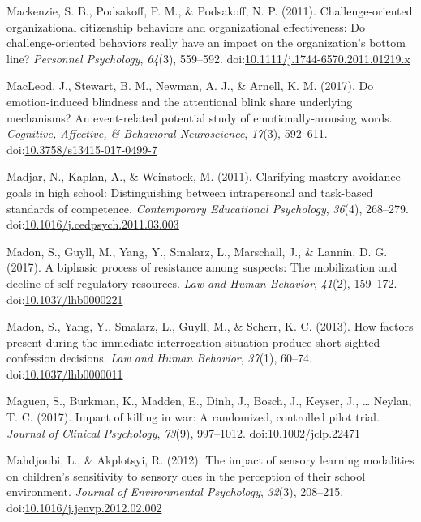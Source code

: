 \documentclass[english,man]{apa6}
\theoremstyle{definition}
\theoremstyle{definition}
\theoremstyle{definition}
\theoremstyle{remark}
\begin{document}
\hypertarget{ref-Mackenzie2011}{}
Mackenzie, S. B., Podsakoff, P. M., \& Podsakoff, N. P. (2011).
Challenge-oriented organizational citizenship behaviors and
organizational effectiveness: Do challenge-oriented behaviors really
have an impact on the organization's bottom line? \emph{Personnel
Psychology}, \emph{64}(3), 559--592.
doi:\href{https://doi.org/10.1111/j.1744-6570.2011.01219.x}{10.1111/j.1744-6570.2011.01219.x}

\hypertarget{ref-MacLeod2017}{}
MacLeod, J., Stewart, B. M., Newman, A. J., \& Arnell, K. M. (2017). Do
emotion-induced blindness and the attentional blink share underlying
mechanisms? An event-related potential study of emotionally-arousing
words. \emph{Cognitive, Affective, \& Behavioral Neuroscience},
\emph{17}(3), 592--611.
doi:\href{https://doi.org/10.3758/s13415-017-0499-7}{10.3758/s13415-017-0499-7}

\hypertarget{ref-Madjar2011}{}
Madjar, N., Kaplan, A., \& Weinstock, M. (2011). Clarifying
mastery-avoidance goals in high school: Distinguishing between
intrapersonal and task-based standards of competence. \emph{Contemporary
Educational Psychology}, \emph{36}(4), 268--279.
doi:\href{https://doi.org/10.1016/j.cedpsych.2011.03.003}{10.1016/j.cedpsych.2011.03.003}

\hypertarget{ref-Madon2017}{}
Madon, S., Guyll, M., Yang, Y., Smalarz, L., Marschall, J., \& Lannin,
D. G. (2017). A biphasic process of resistance among suspects: The
mobilization and decline of self-regulatory resources. \emph{Law and
Human Behavior}, \emph{41}(2), 159--172.
doi:\href{https://doi.org/10.1037/lhb0000221}{10.1037/lhb0000221}

\hypertarget{ref-Madon2013}{}
Madon, S., Yang, Y., Smalarz, L., Guyll, M., \& Scherr, K. C. (2013).
How factors present during the immediate interrogation situation produce
short-sighted confession decisions. \emph{Law and Human Behavior},
\emph{37}(1), 60--74.
doi:\href{https://doi.org/10.1037/lhb0000011}{10.1037/lhb0000011}

\hypertarget{ref-Maguen2017}{}
Maguen, S., Burkman, K., Madden, E., Dinh, J., Bosch, J., Keyser, J.,
\ldots{} Neylan, T. C. (2017). Impact of killing in war: A randomized,
controlled pilot trial. \emph{Journal of Clinical Psychology},
\emph{73}(9), 997--1012.
doi:\href{https://doi.org/10.1002/jclp.22471}{10.1002/jclp.22471}

\hypertarget{ref-Mahdjoubi2012}{}
Mahdjoubi, L., \& Akplotsyi, R. (2012). The impact of sensory learning
modalities on children's sensitivity to sensory cues in the perception
of their school environment. \emph{Journal of Environmental Psychology},
\emph{32}(3), 208--215.
doi:\href{https://doi.org/10.1016/j.jenvp.2012.02.002}{10.1016/j.jenvp.2012.02.002}
\end{document}

